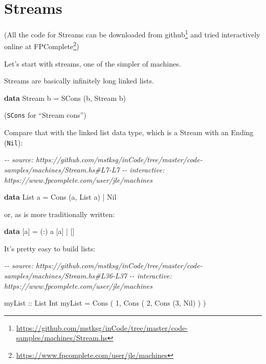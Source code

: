 \documentclass[]{article}
\newenvironment{Shaded}{}{}
\newcommand{\CommentTok}[1]{\textcolor[rgb]{0.38,0.63,0.69}{\textit{#1}}}
\newcommand{\DataTypeTok}[1]{\textcolor[rgb]{0.56,0.13,0.00}{#1}}
\newcommand{\DecValTok}[1]{\textcolor[rgb]{0.25,0.63,0.44}{#1}}
\newcommand{\KeywordTok}[1]{\textcolor[rgb]{0.00,0.44,0.13}{\textbf{#1}}}
\newcommand{\NormalTok}[1]{#1}
\newcommand{\OperatorTok}[1]{\textcolor[rgb]{0.40,0.40,0.40}{#1}}
\newcommand{\OtherTok}[1]{\textcolor[rgb]{0.00,0.44,0.13}{#1}}
\renewcommand{\href}[2]{#2\footnote{\url{#1}}}
\begin{document}
\section{Streams}\label{streams}

(All the code for Streams can be downloaded
\href{https://github.com/mstksg/inCode/tree/master/code-samples/machines/Stream.hs}{from
github} and tried interactively online
\href{https://www.fpcomplete.com/user/jle/machines}{at FPComplete})

Let's start with streams, one of the simpler of machines.

Streams are basically infinitely long linked lists.

\begin{Shaded}
\begin{Highlighting}[]
\KeywordTok{data} \DataTypeTok{Stream}\NormalTok{ b }\OtherTok{=} \DataTypeTok{SCons}\NormalTok{ (b, }\DataTypeTok{Stream}\NormalTok{ b)}
\end{Highlighting}
\end{Shaded}

(\texttt{SCons} for ``Stream cons'')

Compare that with the linked list data type, which is a Stream with an Ending
(\texttt{Nil}):

\begin{Shaded}
\begin{Highlighting}[]
\CommentTok{{-}{-} source: https://github.com/mstksg/inCode/tree/master/code{-}samples/machines/Stream.hs\#L7{-}L7}
\CommentTok{{-}{-} interactive: https://www.fpcomplete.com/user/jle/machines}

\KeywordTok{data} \DataTypeTok{List}\NormalTok{ a }\OtherTok{=} \DataTypeTok{Cons}\NormalTok{ (a, }\DataTypeTok{List}\NormalTok{ a) }\OperatorTok{|} \DataTypeTok{Nil}
\end{Highlighting}
\end{Shaded}

or, as is more traditionally written:

\begin{Shaded}
\begin{Highlighting}[]
\KeywordTok{data}\NormalTok{ [a] }\OtherTok{=}\NormalTok{ (}\OperatorTok{:}\NormalTok{) a [a] }\OperatorTok{|}\NormalTok{ []}
\end{Highlighting}
\end{Shaded}

It's pretty easy to build lists:

\begin{Shaded}
\begin{Highlighting}[]
\CommentTok{{-}{-} source: https://github.com/mstksg/inCode/tree/master/code{-}samples/machines/Stream.hs\#L36{-}L37}
\CommentTok{{-}{-} interactive: https://www.fpcomplete.com/user/jle/machines}

\OtherTok{myList ::} \DataTypeTok{List} \DataTypeTok{Int}
\NormalTok{myList }\OtherTok{=} \DataTypeTok{Cons}\NormalTok{ ( }\DecValTok{1}\NormalTok{, }\DataTypeTok{Cons}\NormalTok{ ( }\DecValTok{2}\NormalTok{, }\DataTypeTok{Cons}\NormalTok{ (}\DecValTok{3}\NormalTok{, }\DataTypeTok{Nil}\NormalTok{) ) )}
\end{Highlighting}
\end{Shaded}
\end{document}
